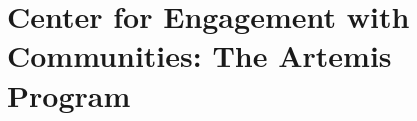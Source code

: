 \documentclass[../../main.tex]{subfiles}
\begin{document}
\begin{flushleft}

\end{flushleft}

\section{Center for Engagement with Communities: The Artemis Program}
\label{sec:cec2}

%

\begin{flushleft}

\end{flushleft}
\end{document}
